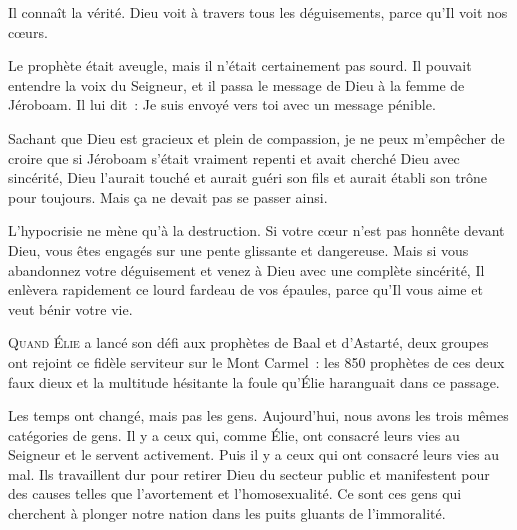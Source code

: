 Il connaît la vérité. Dieu voit à travers tous les déguisements,
 parce qu'Il voit nos c\oe{}urs. 

Le prophète était aveugle, mais il n'était certainement pas sourd.
 Il pouvait entendre la voix du Seigneur, et il passa le message de Dieu
 à la femme de Jéroboam.  Il lui dit~:
 \og Je suis envoyé vers toi avec un message pénible. \fg{}

Sachant que Dieu est gracieux et plein de compassion,
 je ne peux m'empêcher de croire que si Jéroboam s'était vraiment repenti
 et avait cherché Dieu avec sincérité, Dieu l'aurait touché
 et aurait guéri son fils et aurait établi son trône pour toujours.
 Mais ça ne devait pas se passer ainsi. 

L'hypocrisie ne mène qu'à la destruction.
 Si votre c\oe{}ur n'est pas honnête devant Dieu,
 vous êtes engagés sur une pente glissante et dangereuse.
 Mais si vous abandonnez votre déguisement et venez à Dieu
 avec une complète sincérité, Il enlèvera rapidement ce lourd fardeau
 de vos épaules, parce qu'Il vous aime et veut bénir votre vie. 

\dvrule






\lettrine{Q}{uand Élie} a lancé son défi aux prophètes
 de Baal et d'Astarté, deux groupes ont rejoint ce fidèle serviteur
 sur le Mont Carmel~: les 850 \og prophètes \fg{} de ces deux faux dieux
 et la multitude hésitante
 \ocadr la foule qu'Élie haranguait dans ce passage. 

Les temps ont changé, mais pas les gens.
 Aujourd'hui, nous avons les trois mêmes catégories de gens.
 Il y a ceux qui, comme Élie, ont consacré leurs vies au Seigneur
 et le servent activement.
 Puis il y a ceux qui ont consacré leurs vies au mal.
 Ils travaillent dur pour retirer Dieu du secteur public
 et manifestent pour des causes telles que l'avortement et l'homosexualité.
 Ce sont ces gens qui cherchent à plonger notre nation
 dans les puits gluants de l'immoralité. 

